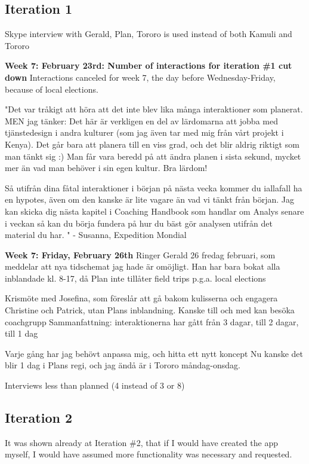 \subsection{Iteration 1}
Skype interview with Gerald, Plan, Tororo is used instead of both Kamuli and Tororo

\textbf{Week 7: February 23rd: Number of interactions for iteration \#1 cut down}
Interactions canceled for week 7, the day before Wednesday-Friday, because of local elections.

"Det var tråkigt att höra att det inte blev lika många interaktioner som planerat.
MEN jag tänker: Det här är verkligen en del av lärdomarna att jobba med tjänstedesign i andra kulturer (som jag även tar med mig från vårt projekt i Kenya). Det går bara att planera till en viss grad, och det blir aldrig riktigt som man tänkt sig :) Man får vara beredd på att ändra planen i sista sekund, mycket mer än vad man behöver i sin egen kultur. Bra lärdom!

Så utifrån dina fåtal interaktioner i början på nästa vecka kommer du iallafall ha en hypotes, även om den kanske är lite vagare än vad vi tänkt från början. Jag kan skicka dig nästa kapitel i Coaching Handbook som handlar om Analys senare i veckan så kan du börja fundera på hur du bäst gör analysen utifrån det material du har. " - Susanna, Expedition Mondial

\textbf{Week 7: Friday, February 26th}
Ringer Gerald 26 fredag februari, som meddelar att nya tidschemat jag hade är omöjligt. Han har bara bokat alla inblandade kl. 8-17, då Plan inte tillåter field trips p.g.a. local elections

Krismöte med Josefina, som föreslår att gå bakom kulisserna och engagera Christine och Patrick, utan Plans inblandning. Kanske till och med kan besöka coachgrupp
Sammanfattning: interaktionerna har gått från 3 dagar, till 2 dagar, till 1 dag

Varje gång har jag behövt anpassa mig, och hitta ett nytt koncept
Nu kanske det blir 1 dag i Plans regi, och jag ändå är i Tororo måndag-onsdag.

Interviews less than planned (4 instead of 3 or 8)

\subsection{Iteration 2}
It was shown already at Iteration \#2, that if I would have created the app myself, I would have assumed more functionality was necessary and requested.

